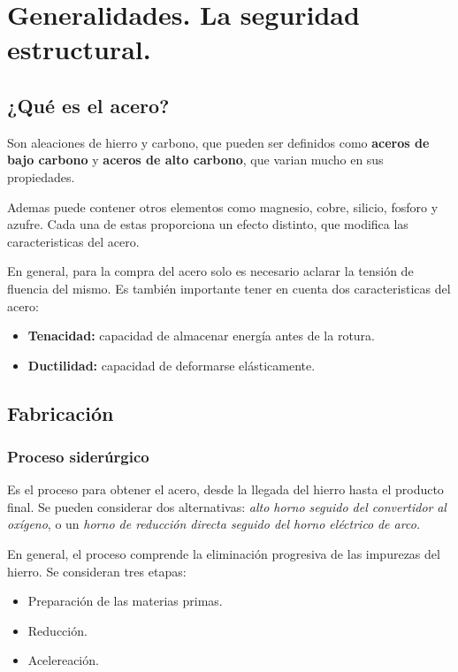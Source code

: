 


\section{Generalidades. La seguridad estructural.}

\subsection{¿Qué es el acero?}

Son aleaciones de hierro y carbono, que pueden ser definidos como 
\textbf{aceros de bajo carbono} y \textbf{aceros de alto carbono}, que varian 
mucho en sus propiedades.

Ademas puede contener otros elementos como magnesio, cobre, silicio, fosforo y
azufre. Cada una de estas proporciona un efecto distinto, que modifica las 
caracteristicas del acero.

En general, para la compra del acero solo es necesario aclarar la tensión de 
fluencia del mismo. Es también importante tener en cuenta dos caracteristicas
del acero:

\begin{itemize}
  \item \textbf{Tenacidad:} capacidad de almacenar energía antes de la rotura.
  \item \textbf{Ductilidad:} capacidad de deformarse elásticamente.
\end{itemize}

\subsection{Fabricación}

\subsubsection{Proceso siderúrgico}

Es el proceso para obtener el acero, desde la llegada del hierro hasta el producto
final. Se pueden considerar dos alternativas: \textit{alto horno seguido del convertidor}
\textit{al oxígeno}, o un \textit{horno de reducción directa seguido del horno eléctrico}
\textit{de arco.} 

En general, el proceso comprende la eliminación progresiva de las impurezas del
hierro. Se consideran tres etapas:

\begin{itemize}
  \item Preparación de las materias primas.
  \item Reducción.
  \item Acelereación.
\end{itemize}

